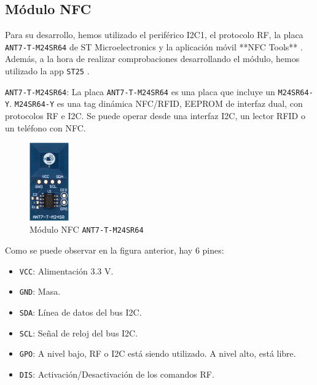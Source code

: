 \subsection{Módulo NFC}

Para su desarrollo, hemos utilizado el periférico I2C1, el protocolo RF, la placa \texttt{ANT7-T-M24SR64} \cite{M24SR64YPagWeb} de ST Microelectronics y la aplicación móvil **NFC Tools** \cite{NFCTools}. Además, a la hora de realizar comprobaciones desarrollando el módulo, hemos utilizado la app \texttt{ST25} \cite{ST25}.

\texttt{ANT7-T-M24SR64}: 
La placa \texttt{ANT7-T-M24SR64} es una placa que incluye un \texttt{M24SR64-Y}. \texttt{M24SR64-Y} es una tag dinámica NFC/RFID, EEPROM de interfaz dual, con protocolos RF e I2C. Se puede operar desde una interfaz I2C, un lector RFID o un teléfono con NFC.

\begin{figure}[h]
    \centering
    \includegraphics[width=0.15\textwidth]{images/2/2-5/M24SR.png}
    \caption{Módulo NFC \texttt{ANT7-T-M24SR64}}
    \label{fig:2-5-modulo-nfc}
\end{figure}

Como se puede observar en la figura anterior, hay 6 pines:

\begin{itemize}
    \item \texttt{VCC}: Alimentación 3.3 V.
    \item \texttt{GND}: Masa.
    \item \texttt{SDA}: Línea de datos del bus I2C.
    \item \texttt{SCL}: Señal de reloj del bus I2C.
    \item \texttt{GPO}: A nivel bajo, RF o I2C está siendo utilizado. A nivel alto, está libre.
    \item \texttt{DIS}: Activación/Desactivación de los comandos RF.
\end{itemize}
